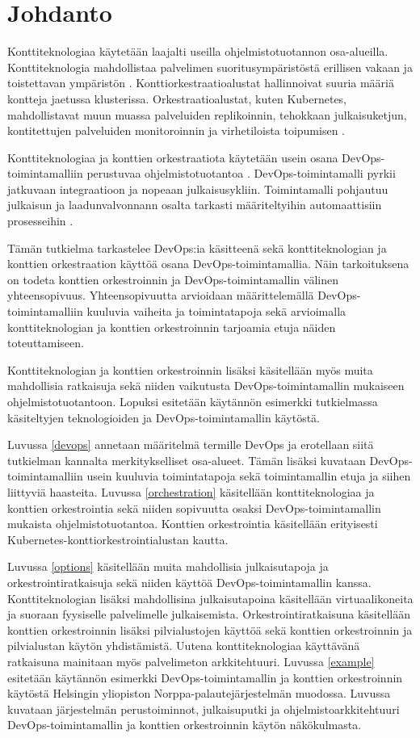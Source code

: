 \chapter{Johdanto\label{intro}}

Konttiteknologiaa käytetään laajalti useilla ohjelmistotuotannon osa-alueilla.
Konttiteknologia mahdollistaa palvelimen suoritusympäristöstä erillisen vakaan ja toistettavan ympäristön \cite{Watada19}.
Konttiorkestraatioalustat hallinnoivat suuria määriä kontteja jaetussa klusterissa.
Orkestraatioalustat, kuten Kubernetes, mahdollistavat muun muassa palveluiden replikoinnin, tehokkaan julkaisuketjun, kontitettujen palveluiden monitoroinnin ja virhetiloista toipumisen \cite{Khan17}.

Konttiteknologiaa ja konttien orkestraatiota käytetään usein osana DevOps-toimintamalliin perustuvaa ohjelmistotuotantoa \cite{Kang16, Narasimhulu23}.
DevOps-toimintamalli pyrkii jatkuvaan integraatioon ja nopeaan julkaisusykliin.
Toimintamalli pohjautuu julkaisun ja laadunvalvonnann osalta tarkasti määriteltyihin automaattisiin prosesseihin \cite{Jabbari16}.

Tämän tutkielma tarkastelee DevOps:ia käsitteenä sekä konttiteknologian ja konttien orkestraation käyttöä osana DevOps-toimintamallia.
Näin tarkoituksena on todeta konttien orkestroinnin ja DevOps-toimintamallin välinen yhteensopivuus.
Yhteensopivuutta arvioidaan määrittelemällä DevOps-toimintamalliin kuuluvia vaiheita ja toimintatapoja sekä arvioimalla konttiteknologian ja konttien orkestroinnin tarjoamia etuja näiden toteuttamiseen.

Konttiteknologian ja konttien orkestroinnin lisäksi käsitellään myös muita mahdollisia ratkaisuja sekä niiden vaikutusta DevOps-toimintamallin mukaiseen ohjelmistotuotantoon.
Lopuksi esitetään käytännön esimerkki tutkielmassa käsiteltyjen teknologioiden ja DevOps-toimintamallin käytöstä.

Luvussa \ref{devops} annetaan määritelmä termille DevOps ja erotellaan siitä tutkielman kannalta merkitykselliset osa-alueet.
Tämän lisäksi kuvataan DevOps-toimintamalliin usein kuuluvia toimintatapoja sekä toimintamallin etuja ja siihen liittyviä haasteita.
Luvussa \ref{orchestration} käsitellään konttiteknologiaa ja konttien orkestrointia sekä niiden sopivuutta osaksi DevOps-toimintamallin mukaista ohjelmistotuotantoa.
Konttien orkestrointia käsitellään erityisesti Kubernetes-konttiorkestrointialustan kautta.

Luvussa \ref{options} käsitellään muita mahdollisia julkaisutapoja ja orkestrointiratkaisuja sekä niiden käyttöä DevOps-toimintamallin kanssa.
Konttiteknologian lisäksi mahdollisina julkaisutapoina käsitellään virtuaalikoneita ja suoraan fyysiselle palvelimelle julkaisemista.
Orkestrointiratkaisuna käsitellään konttien orkestroinnin lisäksi pilvialustojen käyttöä sekä konttien orkestroinnin ja pilvialustan käytön yhdistämistä.
Uutena konttiteknologiaa käyttävänä ratkaisuna mainitaan myös palvelimeton arkkitehtuuri.
Luvussa \ref{example} esitetään käytännön esimerkki DevOps-toimintamallin ja konttien orkestroinnin käytöstä Helsingin yliopiston Norppa-palautejärjestelmän muodossa.
Luvussa kuvataan järjestelmän perustoiminnot, julkaisuputki ja ohjelmistoarkkitehtuuri DevOps-toimintamallin ja konttien orkestroinnin käytön näkökulmasta.

